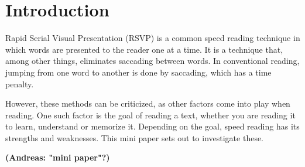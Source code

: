 \section{Introduction}
Rapid Serial Visual Presentation (RSVP) is a common speed reading technique in which words are presented to the reader one at a time. It is a technique that, among other things, eliminates saccading between words. In conventional reading, jumping from one word to another is done by saccading, which has a time penalty.

However, these methods can be criticized, as other factors come into play when reading. One such factor is the goal of reading a text, whether you are reading it to learn, understand or memorize it. Depending on the goal, speed reading has its strengths and weaknesses. This mini paper sets out to investigate these.

\textbf{(Andreas: "mini paper"?)}

